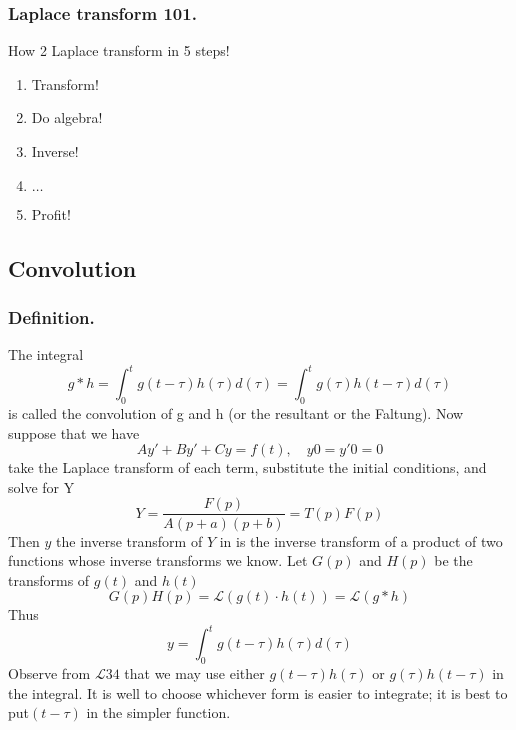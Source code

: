 \documentclass[../main.tex]{subfiles}
\begin{document}
\subsubsection*{Laplace transform 101.} How 2 Laplace transform in 5 steps!
\begin{enumerate}
    \item Transform!
    \item Do algebra!
    \item Inverse!
    \item $\dots$
    \item Profit!
\end{enumerate}

\subsection*{Convolution}
\subsubsection*{Definition.} The integral
\begin{equation*}
    g*h=\int_{0}^{t}g(t-\tau)h(\tau)d(\tau)=\int_{0}^{t}g(\tau)h(t-\tau)d(\tau)
\end{equation*}
is called the convolution of g and h (or the resultant or the Faltung). Now suppose that we have
\begin{equation*}
    Ay' + By' + Cy = f (t), \quad y0 = y'0 = 0
\end{equation*}
take the Laplace transform of each term, substitute the initial conditions, and solve for Y
\begin{equation*}
    Y=\frac{F(p)}{A(p + a)(p + b)}=T(p)F(p)
\end{equation*}
Then $y$ the inverse transform of $Y$ in is the inverse transform of a product of two functions whose inverse transforms we know. Let $G(p)$ and $H(p)$ be the transforms of $g(t)$ and $h(t)$
\begin{equation*}
    G(p)H(p)=\mathcal{L}(g(t)\cdot h(t))=\mathcal{L}(g*h)
\end{equation*} 
Thus
\begin{equation*}
    y=\int_{0}^{t}g(t-\tau)h(\tau)d(\tau)
\end{equation*}
Observe from $\mathcal{L}34$ that we may use either $g(t - \tau )h(\tau )$ or $g(\tau )h(t - \tau )$ in the integral. It is well to choose whichever form is easier to integrate; it is best to put$ (t - \tau )$ in the simpler function.
\end{document}
